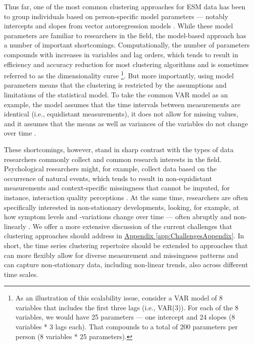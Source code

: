 \documentclass[man, 12pt, a4paper, mask]{apa7}
\theoremstyle{break}
\theoremstyle{plain}
\newcommand{\appref}[2][]{\hyperref[#2]{Appendix \ref*{#2}#1}}
\begin{document}
Thus far, one of the most common clustering approaches for ESM data has been to group individuals based on person-specific model parameters --- notably intercepts and slopes from vector autoregression models \citep[VAR; e.g.,][]{ariens2020}. While these model parameters are familiar to researchers in the field, the model-based approach has a number of important shortcomings. Computationally, the number of parameters compounds with increases in variables and lag orders, which tends to result in efficiency and accuracy reduction for most clustering algorithms and is sometimes referred to as the dimensionality curse \citep{altman2018}\footnote{As an illustration of this scalability issue, consider a VAR model of 8 variables that includes the first three lags (i.e., VAR(3)). For each of the 8 variables, we would have 25 parameters --- one intercept and 24 slopes (8 variables * 3 lags each). That compounds to a total of 200 parameters per person (8 variables * 25 parameters).}. But more importantly, using model parameters means that the clustering is restricted by the assumptions and limitations of the statistical model. To take the common VAR model as an example, the model assumes that the time intervals between measurements are identical (i.e., equidistant measurements), it does not allow for missing values, and it assumes that the means as well as variances of the variables do not change over time \citep[i.e., stationarity assumption;][]{lutkepohl2005}. 

These shortcomings, however, stand in sharp contrast with the types of data researchers commonly collect and common research interests in the field. Psychological researchers might, for example, collect data based on the occurrence of natural events, which tends to result in non-equidistant measurements \citep[e.g.,][]{myin-germeys2018, hamaker2017} and context-specific missingness that cannot be imputed, for instance, interaction quality perceptions \citep[e.g.,][]{kivela2022, lavori2008}. At the same time, researchers are often specifically interested in non-stationary developments, looking, for example, at how symptom levels and -variations change over time --- often abruptly and non-linearly \citep[][]{bringmann2018b, helmich2020a}. We offer a more extensive discussion of the current challenges that clustering approaches should address in \appref{app:ChallengesAppendix}. In short, the time series clustering repertoire should be extended to approaches that can more flexibly allow for diverse measurement and missingness patterns and can capture non-stationary data, including non-linear trends, also across different time scales.
\end{document}
